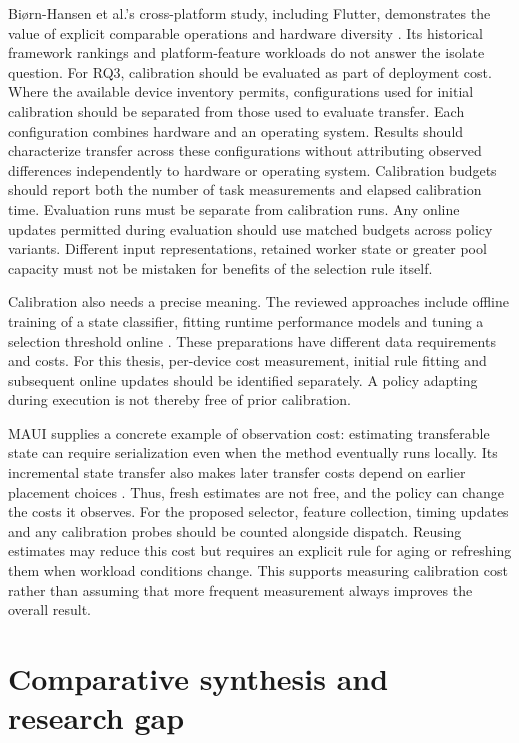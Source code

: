 \documentclass[14pt,a4paper,oneside]{extreport}
\begin{document}
Biørn-Hansen et al.'s cross-platform study, including Flutter, demonstrates the value of
explicit comparable operations and hardware diversity \citep{biornhansen2020}. Its historical
framework rankings and platform-feature workloads do not answer the isolate question. For RQ3,
calibration should be evaluated as part of deployment cost. Where the available device
inventory permits, configurations used for initial calibration should be separated from those
used to evaluate transfer. Each configuration combines hardware and an operating system.
Results should characterize transfer across these configurations without attributing observed
differences independently to hardware or operating system. Calibration budgets should report
both the number of task measurements and elapsed calibration time. Evaluation runs must be
separate from calibration runs. Any online updates permitted during evaluation should use
matched budgets across policy variants. Different input representations, retained worker state
or greater pool capacity must not be mistaken for benefits of the selection rule itself.

Calibration also needs a precise meaning. The reviewed approaches include offline training of
a state classifier, fitting runtime performance models and tuning a selection threshold online
\citep{iaware2023, furmento2025, wagle2019}. These preparations have different data
requirements and costs. For this thesis, per-device cost measurement, initial rule fitting and
subsequent online updates should be identified separately. A policy adapting during execution
is not thereby free of prior calibration.

MAUI supplies a concrete example of observation cost: estimating transferable state can
require serialization even when the method eventually runs locally. Its incremental state
transfer also makes later transfer costs depend on earlier placement choices
\citep[Sec. 5.2.1]{maui2010}. Thus, fresh estimates are not free, and the policy can change
the costs it observes. For the proposed selector, feature collection, timing updates and any
calibration probes should be counted alongside dispatch. Reusing estimates may reduce this
cost but requires an explicit rule for aging or refreshing them when workload conditions
change. This supports measuring calibration cost rather than assuming that more frequent
measurement always improves the overall result.

\section{Comparative synthesis and research gap}
\label{comparative-synthesis-and-research-gap}
\end{document}
